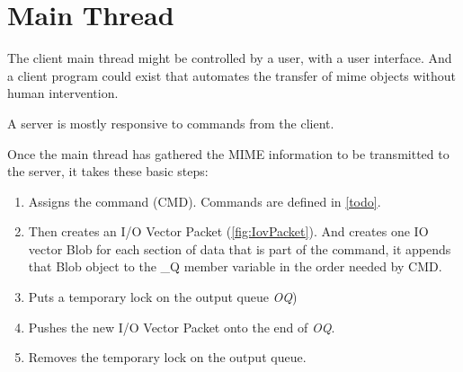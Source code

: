 \section{Main Thread}\label{sec:MainThread}
The client main thread might be controlled by a user, with
a user interface.
And a client program could exist that automates the
transfer of mime objects without human intervention.

A server is mostly responsive to commands from the client.

Once the main thread has gathered the MIME information to
be transmitted to the server, it takes these basic steps:

\begin{enumerate}
\item Assigns the command (CMD). Commands are defined
  in \ref{todo}.
  
\item Then creates an I/O Vector Packet (\ref{fig:IovPacket}).
  And creates one IO vector Blob for each section of data
  that is part of the command, it appends that Blob object
  to the \_Q member variable in the order needed by CMD.

\item Puts a temporary lock on the output queue \textit{OQ})
  
\item Pushes the new I/O Vector Packet onto the
  end of \textit{OQ}.

\item Removes the temporary lock on the output queue.
  
\end{enumerate}
